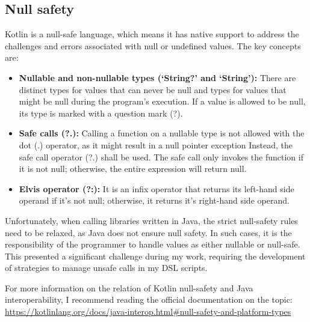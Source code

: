\subsection{Null safety}

Kotlin is a null-safe language, which means it has native support to address the challenges and errors associated with null or undefined values. The key concepts are:

\begin{itemize}
    \item \textbf{Nullable and non-nullable types (`String?' and `String'):} There are distinct types for values that can never be null and types for values that might be null during the program's execution. If a value is allowed to be null, its type is marked with a question mark (?).
    \item \textbf{Safe calls (?.):} Calling a function on a nullable type is not allowed with the dot (.) operator, as it might result in a null pointer exception Instead, the safe call operator (?.) shall be used. The safe call only invokes the function if it is not null; otherwise, the entire expression will return null.
    \item \textbf{Elvis operator (?:):} It is an infix operator that returns its left-hand side operand if it's not null; otherwise, it returns it's right-hand side operand.
\end{itemize}

Unfortunately, when calling libraries written in Java, the strict null-safety rules need to be relaxed, as Java does not ensure null safety. In such cases, it is the responsibility of the programmer to handle values as either nullable or null-safe. This presented a significant challenge during my work, requiring the development of strategies to manage unsafe calls in my DSL scripts.

For more information on the relation of Kotlin null-safety and Java interoperability, I recommend reading the official documentation on the topic: \url{https://kotlinlang.org/docs/java-interop.html\#null-safety-and-platform-types}
